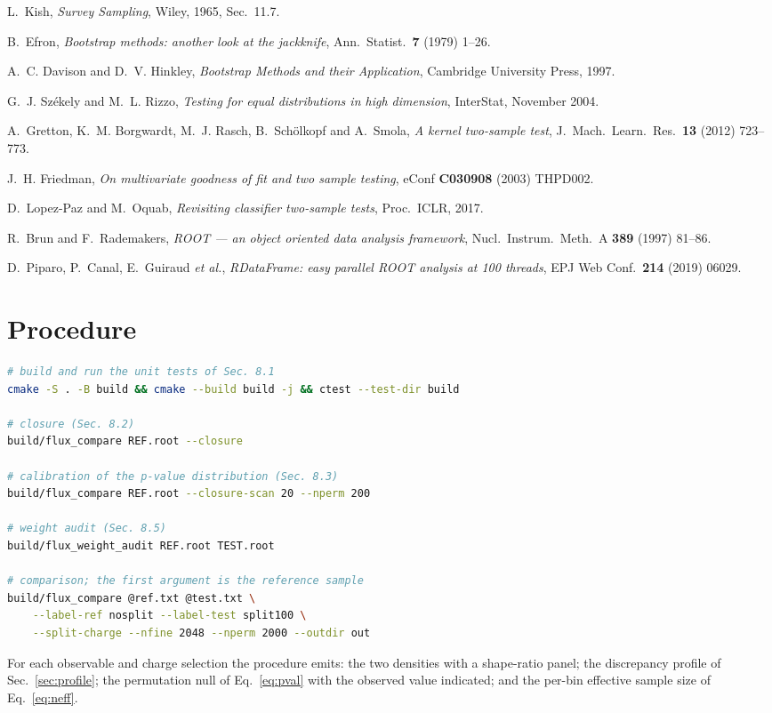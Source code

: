 \documentclass[11pt,a4paper]{article}
\theoremstyle{definition}
\theoremstyle{plain}
\theoremstyle{remark}
\begin{document}
\begin{thebibliography}{99}
L.~Kish, \emph{Survey Sampling}, Wiley, 1965, Sec.~11.7.

B.~Efron,
\emph{Bootstrap methods: another look at the jackknife},
Ann.\ Statist.\ \textbf{7} (1979) 1--26.

A.~C. Davison and D.~V. Hinkley,
\emph{Bootstrap Methods and their Application}, Cambridge University Press,
1997.

G.~J. Sz\'ekely and M.~L. Rizzo,
\emph{Testing for equal distributions in high dimension},
InterStat, November 2004.

A.~Gretton, K.~M. Borgwardt, M.~J. Rasch, B.~Sch\"olkopf and A.~Smola,
\emph{A kernel two-sample test},
J.\ Mach.\ Learn.\ Res.\ \textbf{13} (2012) 723--773.

J.~H. Friedman,
\emph{On multivariate goodness of fit and two sample testing},
eConf \textbf{C030908} (2003) THPD002.

D.~Lopez-Paz and M.~Oquab,
\emph{Revisiting classifier two-sample tests},
Proc.\ ICLR, 2017.

R.~Brun and F.~Rademakers,
\emph{ROOT --- an object oriented data analysis framework},
Nucl.\ Instrum.\ Meth.\ A \textbf{389} (1997) 81--86.

D.~Piparo, P.~Canal, E.~Guiraud \emph{et al.},
\emph{RDataFrame: easy parallel ROOT analysis at 100 threads},
EPJ Web Conf.\ \textbf{214} (2019) 06029.

\end{thebibliography}

\appendix
\section{Procedure}

\begin{lstlisting}[language=bash]
# build and run the unit tests of Sec. 8.1
cmake -S . -B build && cmake --build build -j && ctest --test-dir build

# closure (Sec. 8.2)
build/flux_compare REF.root --closure

# calibration of the p-value distribution (Sec. 8.3)
build/flux_compare REF.root --closure-scan 20 --nperm 200

# weight audit (Sec. 8.5)
build/flux_weight_audit REF.root TEST.root

# comparison; the first argument is the reference sample
build/flux_compare @ref.txt @test.txt \
    --label-ref nosplit --label-test split100 \
    --split-charge --nfine 2048 --nperm 2000 --outdir out
\end{lstlisting}

\noindent
For each observable and charge selection the procedure emits: the two densities
with a shape-ratio panel; the discrepancy profile of Sec.~\ref{sec:profile}; the
permutation null of Eq.~\eqref{eq:pval} with the observed value indicated; and
the per-bin effective sample size of Eq.~\eqref{eq:neff}.
\end{document}
